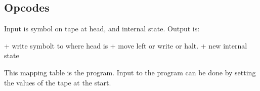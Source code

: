 
\subsection{Opcodes}

Input is symbol on tape at head, and internal state.
Output is:

+ write symbolt to where head is
+ move left or write or halt.
+ new internal state

This mapping table is the program. Input to the program can be done by setting the values of the tape at the start.

